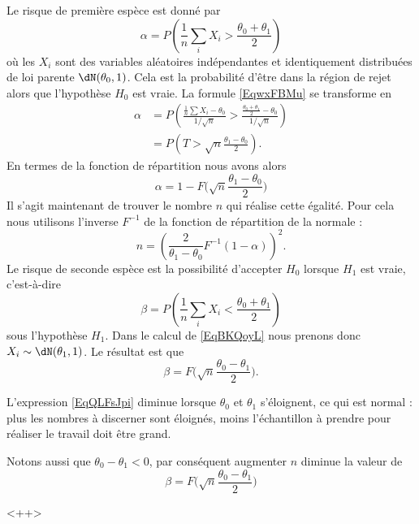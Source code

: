 \begin{example}
	Le risque de première espèce est donné par
	\begin{equation}    \label{EqwxFBMu}
		\alpha=P\left( \frac{1}{ n }\sum_iX_i>\frac{ \theta_0+\theta_1 }{2} \right)
	\end{equation}
	où les \( X_i\) sont des variables aléatoires indépendantes et identiquement distribuées de loi parente \( \dN(\theta_0,1)\). Cela est la probabilité d'être dans la région de rejet alors que l'hypothèse \( H_0\) est vraie. La formule \eqref{EqwxFBMu} se transforme en
	\begin{subequations}
		\begin{align}
			\alpha & =P\left( \frac{ \frac{1}{ n }\sum X_i-\theta_0 }{ 1/\sqrt{n} }>\frac{ \frac{ \theta_0+\theta_1 }{2}-\theta_0 }{ 1/\sqrt{n} } \right) \\
			       & =P(T>\sqrt{n}\frac{ \theta_1-\theta_0 }{2}).
		\end{align}
	\end{subequations}
	En termes de la fonction de répartition nous avons alors
	\begin{equation}
		\alpha=1-F\big( \sqrt{n}\frac{ \theta_1-\theta_0 }{2} \big)
	\end{equation}
	Il s'agit maintenant de trouver le nombre \( n\) qui réalise cette égalité. Pour cela nous utilisons l'inverse \( F^{-1}\) de la fonction de répartition de la normale :
	\begin{equation}    \label{EqQLFsJpi}
		n=\left( \frac{ 2 }{ \theta_1-\theta_0 }F^{-1}(1-\alpha) \right)^2.
	\end{equation}
	Le risque de seconde espèce est la possibilité d'accepter \( H_0\) lorsque \( H_1\) est vraie, c'est-à-dire
	\begin{equation}        \label{EqBKQoyL}
		\beta=P\left( \frac{1}{ n }\sum_i X_i<\frac{ \theta_0+\theta_1 }{2} \right)
	\end{equation}
	sous l'hypothèse \( H_1\). Dans le calcul de \eqref{EqBKQoyL} nous prenons donc \( X_i\sim\dN(\theta_1,1)\). Le résultat est que
	\begin{equation}
		\beta=F\big( \sqrt{n}\frac{ \theta_0-\theta_1 }{2} \big).
	\end{equation}

	\begin{remark}
		L'expression \eqref{EqQLFsJpi} diminue lorsque \( \theta_0\) et \( \theta_1\) s'éloignent, ce qui est normal : plus les nombres à discerner sont éloignés, moins l'échantillon à prendre pour réaliser le travail doit être grand.

		Notons aussi que \( \theta_0-\theta_1<0\), par conséquent augmenter \( n\) diminue la valeur de
		\begin{equation}
			\beta=F\big( \sqrt{n}\frac{ \theta_0-\theta_1 }{2} \big)
		\end{equation}
	\end{remark}
\end{example}
<++>


